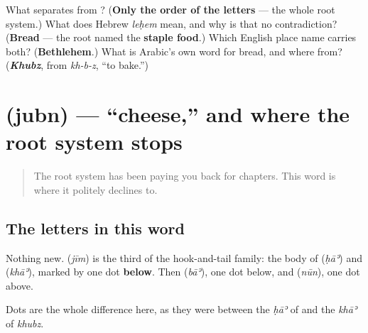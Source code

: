 \begin{tcolorbox}[breakable,colback=teal!4,colframe=teal!35!black,title={Before you move on}]
What separates \textbf{} from \textbf{}? (\textbf{Only the order of the letters} — the whole root system.) What does Hebrew \emph{leḥem} mean, and why is that no contradiction? (\textbf{Bread} — the root named the \textbf{staple food}.) Which English place name carries both? (\textbf{Bethlehem}.) What is Arabic's own word for bread, and where from? (\emph{\textbf{Khubz}}, from \emph{kh-b-z}, \textquotedblleft{}to bake.\textquotedblright{})
\end{tcolorbox}
\section[\texorpdfstring{\ar{جبن} (jubn)}{جبن (jubn)}]{ (jubn) — \textquotedblleft{}cheese,\textquotedblright{} and where the root system stops}

\label{lesson:AR-C34-jubn}



\begin{quote}
The root system has been paying you back for chapters. This word is where it politely declines to.
\end{quote}

\subsection*{The letters in this word}
Nothing new. \textbf{} (\emph{jīm}) is the third of the hook-and-tail family: the body of \textbf{} (\emph{ḥāʾ}) and \textbf{} (\emph{khāʾ}), marked by one dot \textbf{below}. Then \textbf{} (\emph{bāʾ}), one dot below, and \textbf{} (\emph{nūn}), one dot above.

Dots are the whole difference here, as they were between the \emph{ḥāʾ} of \textbf{} and the \emph{khāʾ} of \emph{khubz}.

